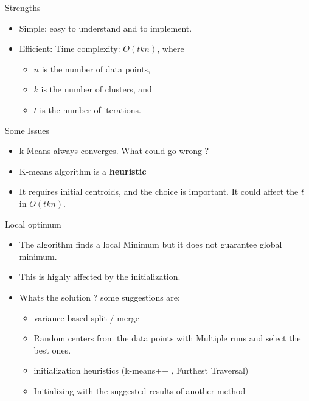\documentclass[serif, aspectratio=169]{beamer}
\begin{document}
\begin{frame}{Strengths}
    \begin{itemize}
        \item Simple: easy to understand and to implement.
        \item  Efficient: Time complexity: $O(tkn)$, 
where
\begin{itemize}
    
\item  $n$ is the number of data points, 
\item $k$ is the number of clusters, and 
\item $t$ is the number of iterations. 
\end{itemize}
        
    \end{itemize}
\end{frame}

\begin{frame}{Some Issues}
    \begin{itemize}
        \item k-Means always converges. What could go wrong ?
        \item K-means algorithm is a \textbf{heuristic}
        \item It requires initial centroids, and the choice is important. It could affect the $t$ in $O(tkn)$.
        
        
        
    \end{itemize}
\end{frame}


\begin{frame}{Local optimum}
    \begin{itemize}
        \item The algorithm finds a local Minimum but it does not guarantee global minimum.
        \item This is highly affected by the initialization.
        \item Whats the solution ? some suggestions are:
        \begin{itemize}
            \item variance-based split / merge
            \item Random centers from the data points with Multiple runs and select the best ones.
            \item initialization heuristics (k-means++ , Furthest Traversal)
            \item Initializing with the suggested results of another method
        \end{itemize}
    \end{itemize}
\end{frame}
\end{document}
